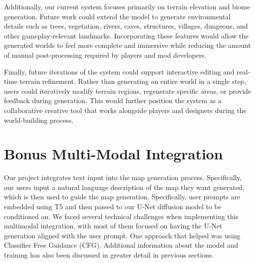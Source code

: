\documentclass[conference]{IEEEtran}
\begin{document}
Additionally, our current system focuses primarily on terrain elevation and biome generation. Future work could extend the model to generate environmental details such as trees, vegetation, rivers, caves, structures, villages, dungeons, and other gameplay-relevant landmarks. Incorporating these features would allow the generated worlds to feel more complete and immersive while reducing the amount of manual post-processing required by players and mod developers.

Finally, future iterations of the system could support interactive editing and real-time terrain refinement. Rather than generating an entire world in a single step, users could iteratively modify terrain regions, regenerate specific areas, or provide feedback during generation. This would further position the system as a collaborative creative tool that works alongside players and designers during the world-building process.

\section{Bonus Multi-Modal Integration}

Our project integrates text input into the map generation process. Specifically, our users input a natural language description of the map they want generated, which is then used to guide the map generation. Specifically, user prompts are embedded using T5 and then passed to our U-Net diffusion model to be conditioned on. We faced several technical challenges when implementing this multimodal integration, with most of them focused on having the U-Net generation aligned with the user prompt. One approach that helped was using Classifier Free Guidance (CFG). Additional information about the model and training has also been discussed in greater detail in previous sections.





\end{document}
